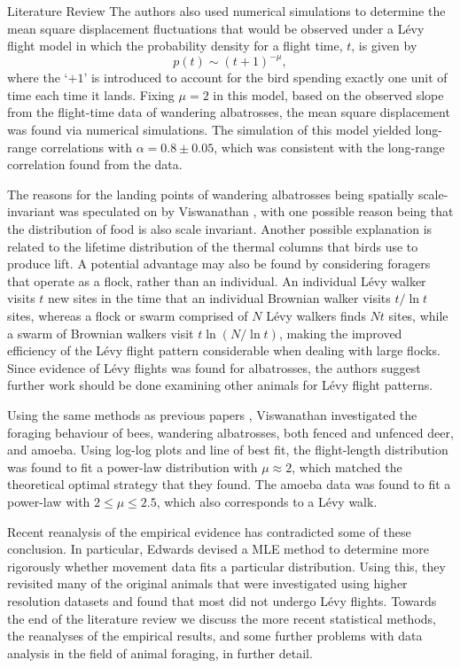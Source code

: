 \begin{section}{Literature Review \label{sec:litreview}}
The authors also used numerical simulations to determine the mean square displacement fluctuations that would be observed under a L\'{e}vy flight model in which the probability density for a flight time, $t$, is given by
\[p(t) \sim (t + 1)^{-\mu} ,\]
where the `$+1$' is introduced to account for the bird spending exactly one unit of time each time it lands.
Fixing $\mu = 2$ in this model, based on the observed slope from the flight-time data of wandering albatrosses, the mean square displacement was found via numerical simulations.
The simulation of this model yielded long-range correlations with $\alpha = 0.8 \pm 0.05$, which was consistent with the long-range correlation found from the data. 

The reasons for the landing points of wandering albatrosses being spatially scale-invariant was speculated on by Viswanathan \etal \cite{Viswanathan_1996}, with one possible reason being that the distribution of food is also scale invariant.
Another possible explanation is related to the lifetime distribution of the thermal columns that birds use to produce lift.
A potential advantage may also be found by considering foragers that operate as a flock, rather than an individual.
An individual L\'{e}vy walker visits $t$ new sites in the time that an individual Brownian walker visits $t/\ln t$ sites, whereas a flock or swarm comprised of $N$ L\'{e}vy walkers finds $Nt$ sites, while a swarm of Brownian walkers visit $t \ln(N/\ln t)$, making the improved efficiency of the L\'{e}vy flight pattern considerable when dealing with large flocks.
Since evidence of L\'{e}vy flights was found for albatrosses, the authors suggest further work should be done examining other animals for L\'{e}vy flight patterns.

Using the same methods as previous papers \cite{Cole_1995,Viswanathan_1996}, Viswanathan \etal \cite{Viswanathan_1999} investigated the foraging behaviour of bees, wandering albatrosses, both fenced and unfenced deer, and amoeba.  Using log-log plots and line of best fit, the flight-length distribution was found to fit a power-law distribution with $\mu \approx 2$, which matched the theoretical optimal strategy that they found.
The amoeba data was found to fit a power-law with $2 \leq \mu \leq 2.5$, which also corresponds to a L\'{e}vy walk.

Recent reanalysis of the empirical evidence has contradicted some of these conclusion. In particular, Edwards \etal \cite{Edwards_2011} devised a \ac{MLE} method to determine more rigorously whether movement data fits a particular distribution. Using this, they revisited many of the original animals that were investigated using higher resolution datasets and found that most did not undergo L\'{e}vy flights. Towards the end of the literature review we discuss the more recent statistical methods, the reanalyses of the empirical results, and some further problems with data analysis in the field of animal foraging, in further detail.


\end{section}

